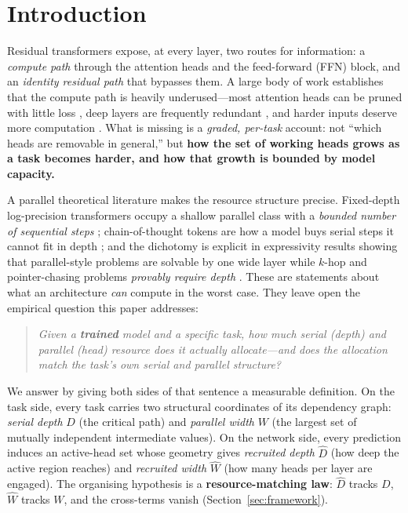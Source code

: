 \documentclass[11pt]{article}
\newcommand{\Dh}{\hat{D}}
\newcommand{\Wh}{\hat{W}}
\begin{document}
\section{Introduction}
Residual transformers expose, at every layer, two routes for information: a
\emph{compute path} through the attention heads and the feed-forward (FFN)
block, and an \emph{identity residual path} that bypasses them. A large
body of work establishes that the compute path is heavily underused---most
attention heads can be pruned with little loss
\citep{michel2019sixteen,voita2019analyzing}, deep layers are frequently
redundant \citep{men2024shortgpt,gromov2024unreasonable}, and harder inputs
deserve more computation \citep{graves2016adaptive,schuster2022confident}.
What is missing is a \emph{graded, per-task} account: not ``which heads are
removable in general,'' but \textbf{how the set of working heads grows as a
task becomes harder, and how that growth is bounded by model capacity.}

A parallel theoretical literature makes the resource structure precise.
Fixed-depth log-precision transformers occupy a shallow parallel class with a
\emph{bounded number of sequential steps} \citep{merrill2023parallelism};
chain-of-thought tokens are how a model buys serial steps it cannot fit in
depth \citep{merrill2024cot,li2024chain,feng2023towards}; and the dichotomy is
explicit in expressivity results showing that parallel-style problems are
solvable by one wide layer while $k$-hop and pointer-chasing problems
\emph{provably require depth} \citep{sanford2023representational,%
sanford2024transformers}. These are statements about what an architecture
\emph{can} compute in the worst case. They leave open the empirical question
this paper addresses:

\begin{quote}
\emph{Given a \textbf{trained} model and a specific task, how much serial
(depth) and parallel (head) resource does it actually allocate---and does the
allocation match the task's own serial and parallel structure?}
\end{quote}

We answer by giving both sides of that sentence a measurable definition. On
the task side, every task carries two structural coordinates of its dependency
graph: \emph{serial depth} $D$ (the critical path) and \emph{parallel width}
$W$ (the largest set of mutually independent intermediate values). On the
network side, every prediction induces an active-head set whose geometry gives
\emph{recruited depth} $\Dh$ (how deep the active region reaches) and
\emph{recruited width} $\Wh$ (how many heads per layer are engaged). The
organising hypothesis is a \textbf{resource-matching law}: $\Dh$ tracks $D$,
$\Wh$ tracks $W$, and the cross-terms vanish (Section~\ref{sec:framework}).
\end{document}
